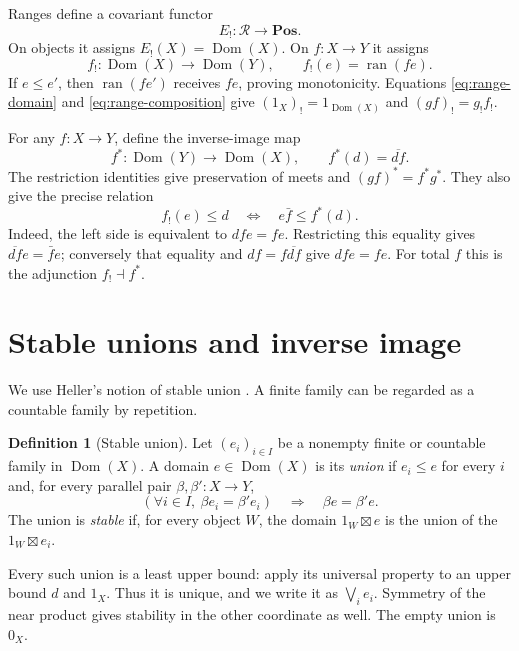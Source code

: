 \documentclass[11pt]{article}
\theoremstyle{definition}
\newtheorem{definition}[theorem]{Definition}
\newcommand{\R}{\mathscr R}
\newcommand{\Pos}{\mathbf{Pos}}
\newcommand{\ran}{\operatorname{ran}}
\begin{document}
Ranges define a covariant functor
\[
 E_!:\R\longrightarrow\Pos.
\]
On objects it assigns $E_!(X)=\operatorname{Dom}(X)$. On $f:X\to Y$ it assigns
\[
 f_!:\operatorname{Dom}(X)\longrightarrow\operatorname{Dom}(Y),\qquad f_!(e)=\ran(fe).
\]
If $e\le e'$, then $\ran(fe')$ receives $fe$, proving monotonicity.
Equations \eqref{eq:range-domain} and \eqref{eq:range-composition} give
$ (1_X)_!=1_{\operatorname{Dom}(X)}$ and $(gf)_!=g_!f_!$.

For any $f:X\to Y$, define the inverse-image map
\[
 f^*:\operatorname{Dom}(Y)\longrightarrow\operatorname{Dom}(X),\qquad f^*(d)=\overline{df}.
\]
The restriction identities give preservation of meets and
$(gf)^*=f^*g^*$. They also give the precise relation
\begin{equation}\label{eq:local-adjunction}
 f_!(e)\le d\quad\Longleftrightarrow\quad
 e\bar f\le f^*(d).
\end{equation}
Indeed, the left side is equivalent to $dfe=fe$. Restricting this equality
gives $\overline{df}e=\bar f e$; conversely that equality and
$df=f\overline{df}$ give $dfe=fe$.
For total $f$ this is the adjunction $f_!\dashv f^*$.

\section{Stable unions and inverse image}

We use Heller's notion of stable union \cite{Heller}. A finite family can be
regarded as a countable family by repetition.

\begin{definition}[Stable union]\label{def:stable-union}
Let $(e_i)_{i\in I}$ be a nonempty finite or countable family in $\operatorname{Dom}(X)$.
A domain $e\in\operatorname{Dom}(X)$ is its \emph{union} if $e_i\le e$ for every $i$ and,
for every parallel pair $\beta,\beta':X\to Y$,
\[
 (\forall i\in I,\ \beta e_i=\beta'e_i)
 \quad\Longrightarrow\quad\beta e=\beta'e.
\]
The union is \emph{stable} if, for every object $W$, the domain
$1_W\boxtimes e$ is the union of the $1_W\boxtimes e_i$.
\end{definition}

Every such union is a least upper bound: apply its universal property to
an upper bound $d$ and $1_X$. Thus it is unique, and we write it as
$\bigvee_i e_i$. Symmetry of the near product gives stability in the other
coordinate as well. The empty union is $0_X$.
\end{document}
